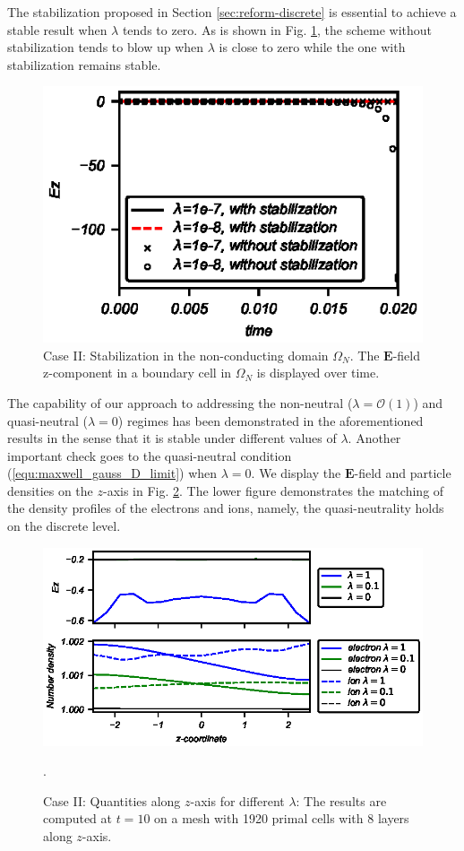\documentclass{article}
\begin{document}
The stabilization proposed in Section \ref{sec:reform-discrete} is essential to achieve a stable result when $\lambda$ tends to zero. As is shown in Fig. \ref{fig:stabilization_comparison}, the scheme without stabilization tends to blow up when $\lambda$ is close to zero while the one with stabilization remains stable. 
\begin{figure}
    \centering
    \includegraphics{stabilizationComparision_stepVoltage.eps}
    \caption{Case II: Stabilization in the non-conducting domain $\Omega_N$. The $\mathbf{E}$-field z-component in a boundary cell in $\Omega_N$ is displayed over time. }
    \label{fig:stabilization_comparison}
\end{figure}

The capability of our approach to addressing the non-neutral ($\lambda = \mathcal{O}(1)$) and quasi-neutral ($\lambda = 0$) regimes has been demonstrated in the aforementioned results in the sense that it is stable under different values of $\lambda$. Another important check goes to the quasi-neutral condition (\ref{equ:maxwell_gauss_D_limit}) when $\lambda = 0$. We display the $\mathbf{E}$-field and particle densities on the $z$-axis in Fig. \ref{fig:zaxis-data_vs_z-T_10}. The lower figure demonstrates the matching of the density profiles of the electrons and ions, namely, the quasi-neutrality holds on the discrete level.

\begin{figure}
    \centering
    \includegraphics{data-vs-z_stepVoltage.eps}
    \caption{Case II: Quantities along $z$-axis for different $\lambda$: The results are computed at $t = 10$ on a mesh with 1920 primal cells with 8 layers along $z$-axis.}.
    \label{fig:zaxis-data_vs_z-T_10}
\end{figure}
\end{document}
